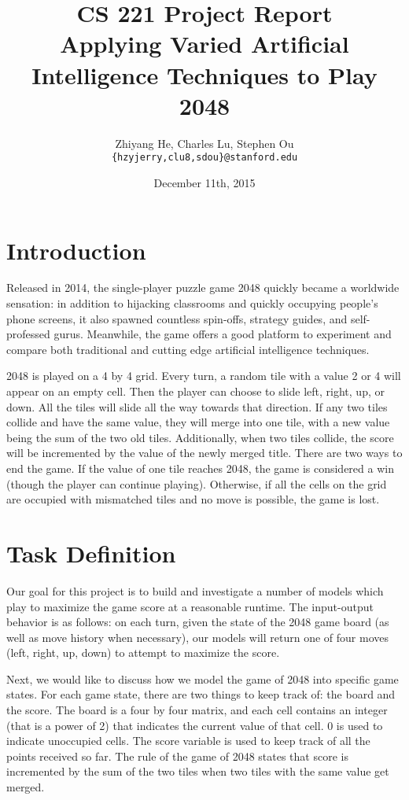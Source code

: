 \documentclass[11pt,twocolumn]{article}
\title{CS 221 Project Report \\ Applying Varied Artificial Intelligence Techniques to Play 2048}
\author{Zhiyang He, Charles Lu, Stephen Ou \\ \texttt{\{hzyjerry,clu8,sdou\}@stanford.edu}}
\date{December 11th, 2015}
\begin{document}
\maketitle

\section{Introduction}

Released in 2014, the single-player puzzle game 2048 quickly became a worldwide sensation: in addition to hijacking classrooms and quickly occupying people’s phone screens, it also spawned countless spin-offs, strategy guides, and self-professed gurus. Meanwhile, the game offers a good platform to experiment and compare both traditional and cutting edge artificial intelligence techniques.

2048 is played on a 4 by 4 grid. Every turn, a random tile with a value 2 or 4 will appear on an empty cell. Then the player can choose to slide left, right, up, or down. All the tiles will slide all the way towards that direction. If any two tiles collide and have the same value, they will merge into one tile, with a new value being the sum of the two old tiles. Additionally, when two tiles collide, the score will be incremented by the value of the newly merged title. There are two ways to end the game. If the value of one tile reaches 2048, the game is considered a win (though the player can continue playing). Otherwise, if all the cells on the grid are occupied with mismatched tiles and no move is possible, the game is lost.

\section{Task Definition}

Our goal for this project is to build and investigate a number of models which play to maximize the game score at a reasonable runtime. The input-output behavior is as follows: on each turn, given the state of the 2048 game board (as well as move history when necessary), our models will return one of four moves (left, right, up, down) to attempt to maximize the score.

Next, we would like to discuss how we model the game of 2048 into specific game states. For each game state, there are two things to keep track of: the board and the score. The board is a four by four matrix, and each cell contains an integer (that is a power of 2) that indicates the current value of that cell. 0 is used to indicate unoccupied cells. The score variable is used to keep track of all the points received so far. The rule of the game of 2048 states that score is incremented by the sum of the two tiles when two tiles with the same value get merged.
\end{document}
